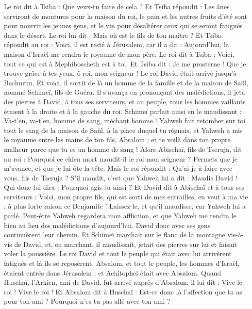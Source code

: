\begin{multicols}{2}
Le roi dit à Tsiba : Que veux-tu faire de cela ? Et Tsiba répondit : Les ânes serviront de montures pour la maison du roi, le pain et les autres fruits d'été sont pour nourrir les jeunes gens, et le vin pour désaltérer ceux qui se seront fatigués dans le désert.
Le roi lui dit : Mais où est le fils de ton maître ? Et Tsiba répondit au roi : Voici, il est resté à Jérusalem, car il a dit : Aujourd'hui, la maison d'Israël me rendra le royaume de mon père.
Le roi dit à Tsiba : Voici, tout ce qui est à Mephiboscheth est à toi. Et Tsiba dit : Je me prosterne ! Que je trouve grâce à tes yeux, ô roi, mon seigneur !
Le roi David était arrivé jusqu'à Bachurim. Et voici, il sortit de là un homme de la famille et de la maison de Saül, nommé Schimeï, fils de Guéra. Il s’avança en prononçant des malédictions,
il jeta des pierres à David, à tous ses serviteurs, et au peuple, tous les hommes vaillants étaient à la droite et à la gauche du roi.
Schimeï parlait ainsi en le maudissant : Va-t’en, va-t’en, homme de sang, méchant homme !
Yahweh fait retomber sur toi tout le sang de la maison de Saül, à la place duquel tu régnais, et Yahweh a mis le royaume entre les mains de ton fils, Absalom ; et te voilà dans ton propre malheur parce que tu es un homme de sang !
Alors Abischaï, fils de Tseruja, dit au roi : Pourquoi ce chien mort maudit-il le roi mon seigneur ? Permets que je m’avance, et que je lui ôte la tête.
Mais le roi répondit : Qu'ai-je à faire avec vous, fils de Tseruja ? S’il maudit, c’est que Yahweh lui a dit : Maudis David ! Qui donc lui dira : Pourquoi agis-tu ainsi ?
Et David dit à Abischaï et à tous ses serviteurs : Voici, mon propre fils, qui est sorti de mes entrailles, en veut à ma vie ; à plus forte raison ce Benjamite ! Laissez-le, et qu'il maudisse, car Yahweh lui a parlé.
Peut-être Yahweh regardera mon affliction, et que Yahweh me rendra le bien au lieu des malédictions d’aujourd'hui.
David donc avec ses gens continuèrent leur chemin. Et Schimeï marchait sur le flanc de la montagne vis-à-vis de David, et, en marchant, il maudissait, jetait des pierres sur lui et faisait voler la poussière.
Le roi David et tout le peuple qui était avec lui arrivèrent fatigués et là ils se reposèrent.
Absalom, et tout le peuple, les hommes d'Israël, étaient entrés dans Jérusalem ; et Achitophel était avec Absalom.
Quand Huschaï, l’Arkien, ami de David, fut arrivé auprès d’Absalom, il lui dit : Vive le roi ! Vive le roi !
Et Absalom dit à Huschaï : Est-ce donc là l'affection que tu as pour ton ami ? Pourquoi n'es-tu pas allé avec ton ami ?

\end{multicols}
